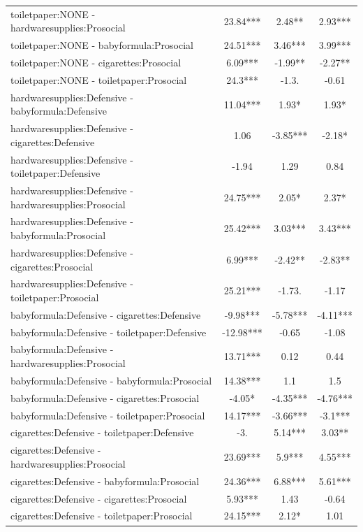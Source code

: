 \documentclass[]{report}
\begin{document}
\begin{longtable}{lccc}
			toiletpaper:NONE - hardwaresupplies:Prosocial & 23.84*** & 2.48** & 2.93*** \\ 
			toiletpaper:NONE - babyformula:Prosocial & 24.51*** & 3.46*** & 3.99*** \\ 
			toiletpaper:NONE - cigarettes:Prosocial & 6.09*** & -1.99** & -2.27** \\ 
			toiletpaper:NONE - toiletpaper:Prosocial & 24.3*** & -1.3. & -0.61 \\ 
			hardwaresupplies:Defensive - babyformula:Defensive & 11.04*** & 1.93* & 1.93* \\ 
			hardwaresupplies:Defensive - cigarettes:Defensive & 1.06 & -3.85*** & -2.18* \\ 
			hardwaresupplies:Defensive - toiletpaper:Defensive & -1.94 & 1.29 & 0.84 \\ 
			hardwaresupplies:Defensive - hardwaresupplies:Prosocial & 24.75*** & 2.05* & 2.37* \\ 
			hardwaresupplies:Defensive - babyformula:Prosocial & 25.42*** & 3.03*** & 3.43*** \\ 
			hardwaresupplies:Defensive - cigarettes:Prosocial & 6.99*** & -2.42** & -2.83** \\ 
			hardwaresupplies:Defensive - toiletpaper:Prosocial & 25.21*** & -1.73. & -1.17 \\ 
			babyformula:Defensive - cigarettes:Defensive & -9.98*** & -5.78*** & -4.11*** \\ 
			babyformula:Defensive - toiletpaper:Defensive & -12.98*** & -0.65 & -1.08 \\ 
			babyformula:Defensive - hardwaresupplies:Prosocial & 13.71*** & 0.12 & 0.44 \\ 
			babyformula:Defensive - babyformula:Prosocial & 14.38*** & 1.1 & 1.5 \\ 
			babyformula:Defensive - cigarettes:Prosocial & -4.05* & -4.35*** & -4.76*** \\ 
			babyformula:Defensive - toiletpaper:Prosocial & 14.17*** & -3.66*** & -3.1*** \\ 
			cigarettes:Defensive - toiletpaper:Defensive & -3. & 5.14*** & 3.03** \\ 
			cigarettes:Defensive - hardwaresupplies:Prosocial & 23.69*** & 5.9*** & 4.55*** \\ 
			cigarettes:Defensive - babyformula:Prosocial & 24.36*** & 6.88*** & 5.61*** \\ 
			cigarettes:Defensive - cigarettes:Prosocial & 5.93*** & 1.43 & -0.64 \\ 
			cigarettes:Defensive - toiletpaper:Prosocial & 24.15*** & 2.12* & 1.01 \\ 

\end{longtable}
\end{document}
